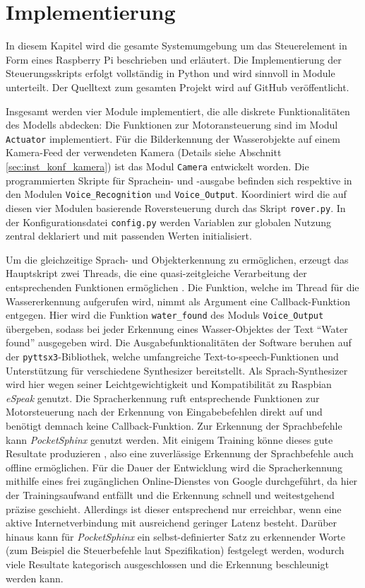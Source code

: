 \chapter{Implementierung}
\label{chp:implementierung}

In diesem Kapitel wird die gesamte Systemumgebung um das Steuerelement in Form eines Raspberry Pi beschrieben und erläutert.
Die Implementierung der Steuerungsskripts erfolgt vollständig in Python und wird sinnvoll in Module unterteilt.
Der Quelltext zum gesamten Projekt wird auf GitHub veröffentlicht.

Insgesamt werden vier Module implementiert, die alle diskrete Funktionalitäten des Modells abdecken: Die Funktionen zur Motoransteuerung sind im Modul \texttt{Actuator} implementiert. 
Für die Bilderkennung der Wasserobjekte auf einem Kamera-Feed der verwendeten Kamera (Details siehe Abschnitt \ref{sec:inst_konf_kamera}) ist das Modul \texttt{Camera} entwickelt worden.
Die programmierten Skripte für Sprachein- und -ausgabe befinden sich respektive in den Modulen \texttt{Voice\_Recognition} und \texttt{Voice\_Output}.
Koordiniert wird die auf diesen vier Modulen basierende Roversteuerung durch das Skript \texttt{rover.py}.
In der Konfigurationsdatei \texttt{config.py} werden Variablen zur globalen Nutzung zentral deklariert und mit passenden Werten initialisiert.

Um die gleichzeitige Sprach- und Objekterkennung zu ermöglichen, erzeugt das Hauptskript zwei Threads, die eine quasi-zeitgleiche Verarbeitung der entsprechenden Funktionen ermöglichen \cite{donat2018, yamanoor2017}.
Die Funktion, welche im Thread für die Wassererkennung aufgerufen wird, nimmt als Argument eine Callback-Funktion entgegen.
Hier wird die Funktion \texttt{water\_found} des Moduls \texttt{Voice\_Output} übergeben, sodass bei jeder Erkennung eines Wasser-Objektes der Text \enquote{Water found} ausgegeben wird.
Die Ausgabefunktionalitäten der Software beruhen auf der \texttt{pyttsx3}-Bibliothek, welche umfangreiche Text-to-speech-Funktionen und Unterstützung für verschiedene Synthesizer bereitstellt.
Als Sprach-Synthesizer wird hier wegen seiner Leichtgewichtigkeit und Kompatibilität zu Raspbian \textit{eSpeak} \cite{molloy2016} genutzt.
Die Spracherkennung ruft entsprechende Funktionen zur Motorsteuerung nach der Erkennung von Eingabebefehlen direkt auf und benötigt demnach keine Callback-Funktion.
Zur Erkennung der Sprachbefehle kann \textit{PocketSphinx} genutzt werden.
Mit einigem Training könne dieses gute Resultate produzieren \cite[vgl.][S. 644]{molloy2016}, also eine zuverlässige Erkennung der Sprachbefehle auch offline ermöglichen.
Für die Dauer der Entwicklung wird die Spracherkennung mithilfe eines frei zugänglichen Online-Dienstes von Google durchgeführt, da hier der Trainingsaufwand entfällt und die Erkennung schnell und weitestgehend präzise geschieht.
Allerdings ist dieser entsprechend nur erreichbar, wenn eine aktive Internetverbindung mit ausreichend geringer Latenz besteht.
Darüber hinaus kann für \textit{PocketSphinx} ein selbst-definierter Satz zu erkennender Worte (zum Beispiel die Steuerbefehle laut Spezifikation) festgelegt werden, wodurch viele Resultate kategorisch ausgeschlossen und die Erkennung beschleunigt werden kann.

